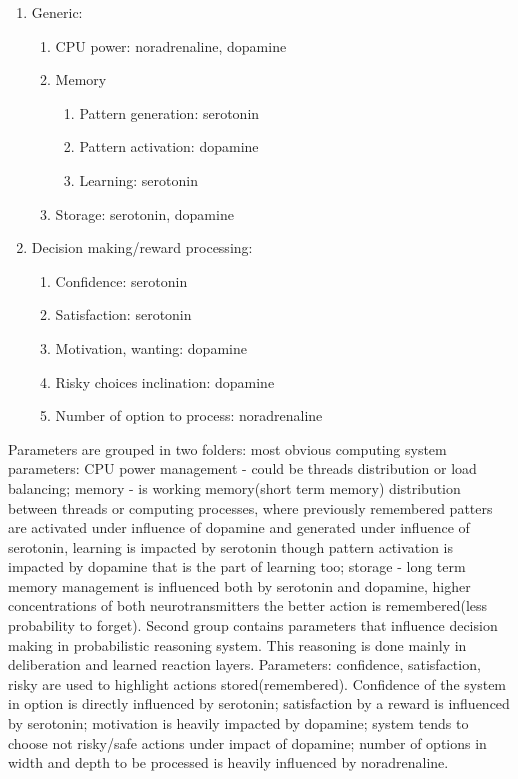 \begin{enumerate}
\item  Generic:
\begin{enumerate}
\item  CPU power: noradrenaline, dopamine
\item  Memory
\begin{enumerate}
\item  Pattern generation: serotonin
\item  Pattern activation: dopamine
\item  Learning: serotonin
\end{enumerate}
\item  Storage: serotonin, dopamine
\end{enumerate}
\item  Decision making/reward processing:
\begin{enumerate}
\item  Confidence: serotonin
\item  Satisfaction: serotonin
\item  Motivation, wanting: dopamine
\item  Risky choices inclination: dopamine
\item  Number of option to process: noradrenaline
\end{enumerate}
\end{enumerate}

Parameters are grouped in two folders: most obvious computing system parameters: CPU power management - could be threads distribution or load balancing; memory - is working memory(short term memory) distribution between threads or computing processes, where previously remembered patters are activated under influence of dopamine and generated under influence of serotonin, learning is impacted by serotonin though pattern activation is impacted by dopamine that is the part of learning too; storage - long term memory management is influenced both by serotonin and dopamine, higher concentrations of both neurotransmitters the better action is remembered(less probability to forget). Second group contains parameters that influence decision making in probabilistic reasoning system. This reasoning is done mainly in deliberation and learned reaction layers. Parameters: confidence, satisfaction, risky are used to highlight actions stored(remembered). Confidence of the system in option is directly influenced by serotonin; satisfaction by a reward is influenced by serotonin; motivation is heavily impacted by dopamine; system tends to choose not risky/safe actions under impact of dopamine; number of options in width and depth to be processed is heavily influenced by noradrenaline.

